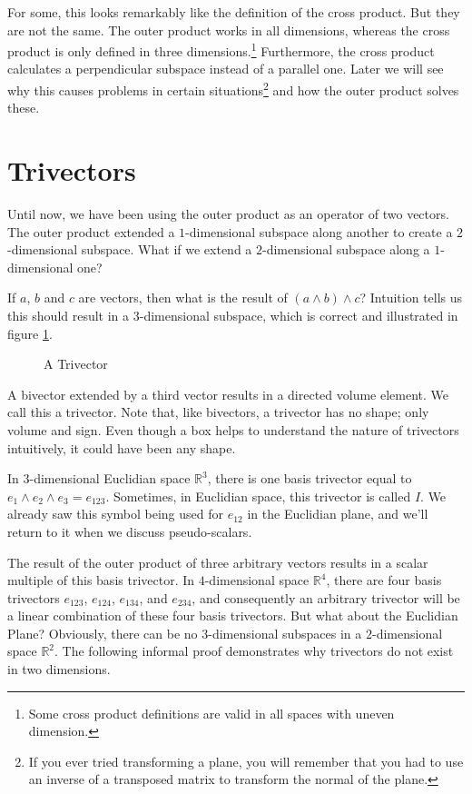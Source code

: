 \documentclass[10pt]{report}
\begin{document}
For some, this looks remarkably like the definition of the cross
product. But they are not the same. The outer product works in all
dimensions, whereas the cross product is only defined in three
dimensions.\footnote{Some cross product definitions are valid in
all spaces with uneven dimension.} Furthermore, the cross product
calculates a perpendicular subspace instead of a parallel one.
Later we will see why this causes problems in certain
situations\footnote{If you ever tried transforming a plane, you
will remember that you had to use an inverse of a transposed
matrix to transform the normal of the plane.} and how the outer
product solves these.

\newpage
\section{Trivectors} Until now, we have been using the outer
product as an operator of two vectors. The outer product extended
a $1$-dimensional subspace along another to create a
$2$-dimensional subspace. What if we extend a $2$-dimensional
subspace along a $1$-dimensional one?

If $a$, $b$ and $c$ are vectors, then what is the result of
$(a\wedge b)\wedge c$? Intuition tells us this should result in a
$3$-dimensional subspace, which is correct and illustrated in
figure \ref{fig:trivector}.

\begin{figure}[ht]
\centering

\caption{A Trivector} \label{fig:trivector}
\end{figure}

A bivector extended by a third vector results in a directed volume
element. We call this a trivector. Note that, like bivectors, a
trivector has no shape; only volume and sign. Even though a box
helps to understand the nature of trivectors intuitively, it could
have been any shape.

In $3$-dimensional Euclidian space $\mathbb{R}^3$, there is one
basis trivector equal to $e_{1}\wedge e_{2}\wedge e_{3} =
e_{123}$. Sometimes, in Euclidian space, this trivector is called
$I$. We already saw this symbol being used for $e_{12}$ in the
Euclidian plane, and we'll return to it when we discuss
pseudo-scalars.

The result of the outer product of three arbitrary vectors results
in a scalar multiple of this basis trivector. In $4$-dimensional
space $\mathbb{R}^4$, there are four basis trivectors $e_{123}$,
$e_{124}$, $e_{134}$, and $e_{234}$, and consequently an arbitrary
trivector will be a linear combination of these four basis
trivectors. But what about the Euclidian Plane? Obviously, there
can be no $3$-dimensional subspaces in a $2$-dimensional space
$\mathbb{R}^2$. The following informal proof demonstrates why
trivectors do not exist in two dimensions.
\end{document}
